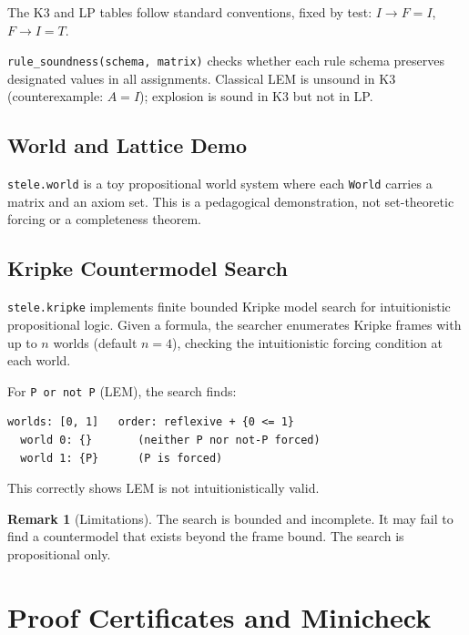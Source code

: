\documentclass[11pt,a4paper]{article}
\theoremstyle{definition}
\newtheorem{remark}{Remark}
\theoremstyle{plain}
\begin{document}
The K3 and LP tables follow standard conventions, fixed by test:
$I \to F = I$, $F \to I = T$.

\texttt{rule\_soundness(schema, matrix)} checks whether each
rule schema preserves designated values in all assignments.
Classical LEM is unsound in K3 (counterexample: $A{=}I$);
explosion is sound in K3 but not in LP.

\subsection{World and Lattice Demo}

\texttt{stele.world} is a toy propositional world system where
each \texttt{World} carries a matrix and an axiom set.
This is a pedagogical demonstration, not set-theoretic forcing
or a completeness theorem.

\subsection{Kripke Countermodel Search}

\texttt{stele.kripke} implements finite bounded Kripke model
search for intuitionistic propositional logic.
Given a formula, the searcher enumerates Kripke frames with up
to $n$ worlds (default $n=4$), checking the intuitionistic
forcing condition at each world.

For \texttt{P or not P} (LEM), the search finds:

\begin{lstlisting}
worlds: [0, 1]   order: reflexive + {0 <= 1}
  world 0: {}       (neither P nor not-P forced)
  world 1: {P}      (P is forced)
\end{lstlisting}

This correctly shows LEM is not intuitionistically valid.

\begin{remark}[Limitations]
  The search is bounded and incomplete.
  It may fail to find a countermodel that exists beyond the
  frame bound.
  The search is propositional only.
\end{remark}

\section{Proof Certificates and Minicheck}
\label{sec:certs}
\end{document}
